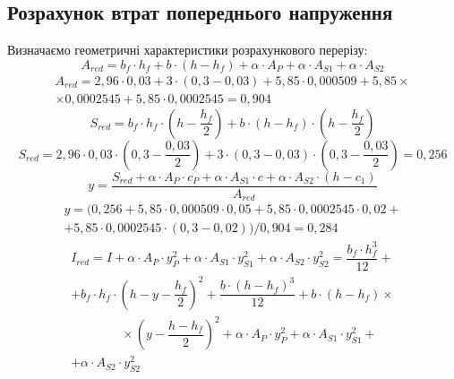\documentclass[a4paper,14pt]{article}
\begin{document}
\subsection{Розрахунок втрат попереднього напруження}
Визначаємо геометричні характеристики розрахункового перерізу:
\begin{equation}
    A_{red} = b_f \cdot h_f + b \cdot (h - h_f) + \alpha \cdot A_P + \alpha \cdot A_{S1} + \alpha \cdot A_{S2}
\end{equation}
\begin{multline*}
    A_{red} = 2,96 \cdot 0,03 + 3 \cdot (0,3 - 0,03) + 5,85 \cdot 0,000509 + 5,85 \times \\ \times 0,0002545 + 5,85 \cdot 0,0002545 = 0,904
\end{multline*}
\begin{equation}
    S_{red} = b_f \cdot h_f \cdot \left(h - \dfrac{h_f}{2}\right) + b \cdot (h - h_f) \cdot \left(h - \dfrac{h_f}{2}\right)
\end{equation}
$$S_{red} = 2,96 \cdot 0,03 \cdot \left(0,3 - \dfrac{0,03}{2}\right) + 3 \cdot (0,3 - 0,03) \cdot \left(0,3 - \dfrac{0,03}{2}\right) = 0,256$$
\begin{equation}
    y = \dfrac{S_{red} + \alpha \cdot A_P \cdot c_P + \alpha \cdot A_{S1} \cdot c + \alpha \cdot A_{S2} \cdot (h - c_1)}{A_{red}}
\end{equation}
\begin{multline*}
    y = (0,256 + 5,85 \cdot 0,000509 \cdot 0,05 + 5,85 \cdot 0,0002545 \cdot 0,02 + \\ + 5,85 \cdot 0,0002545 \cdot (0,3 - 0,02))/0,904 = 0,284
\end{multline*}
\begin{multline}
    I_{red} = I + \alpha \cdot A_P \cdot y_P^2 + \alpha \cdot A_{S1} \cdot y_{S1}^2 + \alpha \cdot A_{S2} \cdot y_{S2}^2 = \dfrac{b_f \cdot h_f^3}{12} +\\+ b_f \cdot h_f \cdot \left(h - y - \dfrac{h_f}{2}\right)^2 + \dfrac{b \cdot (h - h_f)^3}{12} + b \cdot (h - h_f) \times \\ \qquad \qquad \times \left(y - \dfrac{h -h_f}{2}\right)^2 + \alpha \cdot A_P \cdot y_P^2 + \alpha \cdot A_{S1} \cdot y_{S1}^2 +\\+ \alpha \cdot A_{S2} \cdot y_{S2}^2
\end{multline}
\end{document}
